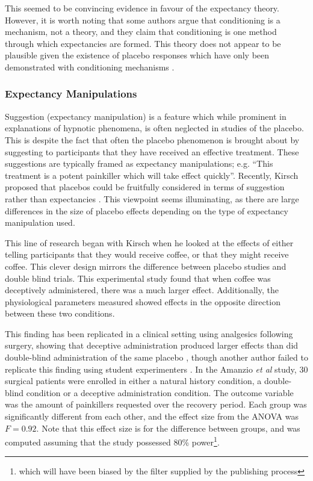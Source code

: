 This seemed to be convincing evidence in favour of the expectancy theory. However, it is worth noting that some authors \cite{Stewart-Williams2004a}  argue that conditioning is a mechanism, not a theory, and they claim that conditioning is one method through which expectancies are formed. This theory does not appear to be plausible given the existence of placebo responses which have only been demonstrated with conditioning mechanisms \cite{benedetti2003a}.   

\subsubsection{Expectancy Manipulations}
\label{sec:suggestion}

Suggestion (expectancy manipulation) is a feature which while prominent in explanations of hypnotic phenomena, is often neglected in studies of the placebo. This is despite the fact that often the placebo phenomenon is brought about by suggesting to participants that they have received an effective treatment. These suggestions are typically framed as expectancy manipulations; e.g. ``This treatment is a potent painkiller which will take effect quickly''. Recently, Kirsch proposed that placebos could be fruitfully considered in terms of suggestion rather than expectancies  \cite{Kirsch1999}. This viewpoint seems illuminating, as there are large differences in the size of placebo effects depending on the type of expectancy manipulation used. 

This line of research began with Kirsch \cite{kirsch1988double} when he looked at the effects of either telling participants that they would receive coffee, or that they might receive coffee. This clever design  mirrors the difference between placebo studies and double blind trials. This experimental study found that when coffee was deceptively administered, there was a much larger effect. Additionally, the physiological parameters measured showed effects in the opposite direction between these two conditions.  

This finding has been replicated in a clinical setting using analgesics following surgery, showing that deceptive administration produced larger effects than did double-blind administration of the same placebo \cite{Amanzio2001}, though another author failed to replicate this finding using student experimenters \cite{Walach2002}. In the Amanzio {\it et al} study, 30 surgical patients were enrolled in either a natural history condition, a double-blind condition or a deceptive administration condition. The outcome variable was the amount of painkillers requested over the recovery period. Each group was significantly different from each other, and the effect size from the ANOVA was $F=0.92$. Note that this effect size is for the difference between groups, and was computed assuming that the study possessed 80\% power\footnote{which will have been biased by the filter supplied by the publishing process}. 


